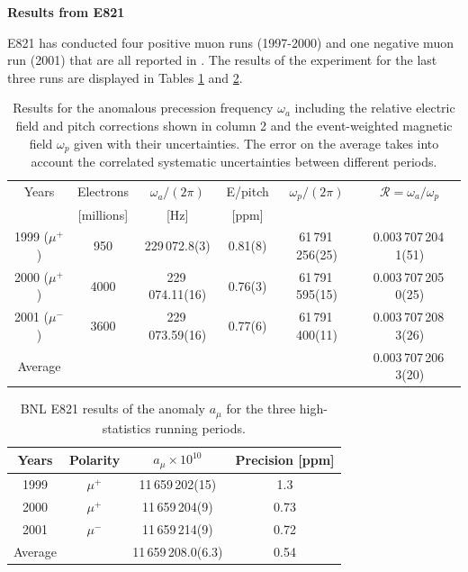 \documentclass{outhesis}
\begin{document}
\textbf{Results from E821}

E821 has conducted four positive muon runs (1997-2000) and one negative muon run (2001) that are all reported in \cite{bnl}. The results of the experiment for the last three runs are displayed in Tables \ref{tab:R} and \ref{tab:amu}.
\begin{table}
  \caption{Results for the anomalous precession frequency $\omega_a$ including the relative electric field and pitch corrections shown in column 2 and the event-weighted magnetic field $\omega_p$ given with their uncertainties. The error on the average takes into account the correlated systematic uncertainties between different periods.}
  \label{tab:R}
  \centering
  \begin{tabular}{*{6}{c}}
	\hline \hline
      Years  & Electrons & $\omega_a/(2\pi)$& E/pitch & $\omega_p/(2\pi)$ & $\mathcal{R} = \omega_a/\omega_p$\\ 
      &[millions] &  [Hz]  &  [ppm]  & & \\
      \hline
       1999 ($\mu^+$) & 950 & 229\,072.8(3) & 0.81(8) & 61\,791\,256(25)& 0.003\,707\,204\,1(51)  \\
       2000 ($\mu^+$) & 4000 & 229\,074.11(16) & 0.76(3) & 61\,791\,595(15)& 0.003\,707\,205\,0(25)  \\
       2001 ($\mu^-$)  & 3600 & 229\,073.59(16) & 0.77(6) & 61\,791\,400(11)& 0.003\,707\,208\,3(26)  \\  \hline
       Average & & & & & 0.003\,707\,206\,3(20) \\
         \hline  \hline
     \end{tabular}
\end{table}
\begin{table}
  \caption{BNL E821 results of the anomaly $a_{\mu}$ for the three high-statistics running periods. }
  \label{tab:amu}
  \centering
  \begin{tabular}{*{4}{c}}
	\hline \hline
      Years  & Polarity & $a_{\mu}\times 10^{10}$ & Precision [ppm] \\ \hline
       1999 & $\mu^+$ & 11\,659\,202(15) & 1.3  \\
       2000 & $\mu^+$ & 11\,659\,204(9) & 0.73  \\
       2001 & $\mu^-$ & 11\,659\,214(9) & 0.72  \\ \hline
       Average & & 11\,659\,208.0(6.3) & 0.54\\
         \hline  \hline
     \end{tabular}
\end{table}
\end{document}
